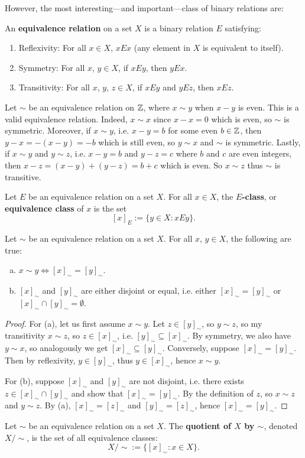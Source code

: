 However, the most interesting---and important---class of binary relations are:

\begin{defbox}
   An \textbf{equivalence relation} on a set $X$ is a binary relation $E$ satisfying:
   \begin{enumerate}
      \item Reflexivity: For all $x \in X$, $xEx$ (any element in $X$ is equivalent to itself).
      \item Symmetry: For all $x$, $y \in X$, if $xEy$, then $yEx$. 
      \item Transitivity: For all $x$, $y$, $z \in X$, if $xEy$ and $yEz$, then $xEz$. 
   \end{enumerate}
\end{defbox}

\begin{example}
   Let $\sim$ be an equivalence relation on $\mathbb{Z}$, where $x \sim y$ when $x - y$ is even. This is a valid equivalence relation. Indeed, $x \sim x$ since $x - x = 0$ which is even, so $\sim$ is symmetric. Moreover, if $x \sim y$, i.e. $x - y = b$ for some even $b \in \mathbb{Z}$, then $y - x = -(x - y) = -b$ which is still even, so $y \sim x$ and $\sim$ is symmetric. Lastly, if $x \sim y$ and $y \sim z$, i.e. $x - y = b$ and $y - z = c$ where $b$ and $c$ are even integers, then $x - z = (x - y) + (y - z) = b + c$ which is even. So $x \sim z$ thus $\sim$ is transitive. 
\end{example}

\begin{defbox}
   Let $E$ be an equivalence relation on a set $X$. For all $x \in X$, the \textbf{$E$-class}, or \textbf{equivalence class} of $x$ is the set
   \[ [x]_E := \{y \in X \colon xEy\}. \]
\end{defbox}
\begin{propbox}
   Let $\sim$ be an equivalence relation on a set $X$. For all $x$, $y \in X$, the following are true:
   \begin{enumerate}[(a)]
      \item $x \sim y \iff [x]_\sim = [y]_\sim$.
      \item $[x]_\sim$ and $[y]_\sim$ are either disjoint or equal, i.e. either $[x]_\sim = [y]_\sim$ or $[x]_\sim \cap [y]_\sim = \emptyset$. 
   \end{enumerate}
\end{propbox}
\begin{proof}
   For (a), let us first assume $x \sim y$. Let $z \in [y]_\sim$, so $y \sim z$, so my transitivity $x \sim z$, so $z \in [x]_\sim$, i.e. $[y]_\sim \subseteq [x]_\sim$. By symmetry, we also have $y \sim x$, so analogously we get $[x]_\sim \subseteq [y]_\sim$. Conversely, suppose $[x]_\sim = [y]_\sim$. Then by reflexivity, $y \in [y]_\sim$, thus $y \in [x]_\sim$, hence $x \sim y$. 

   For (b), suppose $[x]_\sim$ and $[y]_\sim$ are not disjoint, i.e. there exists $z \in [x]_\sim \cap [y]_\sim$ and show that $[x]_\sim = [y]_\sim$. By the definition of $z$, so $x \sim z$ and $y \sim z$. By (a), $[x]_\sim = [z]_\sim$ and $[y]_\sim = [z]_\sim$, hence $[x]_\sim = [y]_\sim$. 
\end{proof}

\begin{defbox}
   Let $\sim$ be an equivalence relation on a set $X$. The \textbf{quotient of $X$ by $\sim$}, denoted $X / \sim$, is the set of all equivalence classes:
   \[ X / \sim := \{[x]_\sim \colon x \in X\}. \]
\end{defbox}
